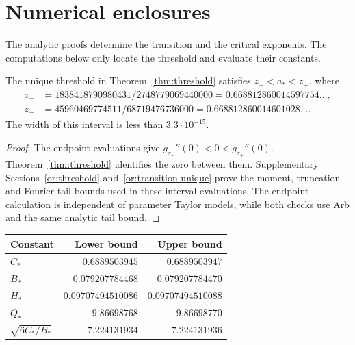 \section{Numerical enclosures}\label{app:threshold}

The analytic proofs determine the transition and the critical exponents.
The computations below only locate the threshold and evaluate their constants.

\begin{corollary}\label{cor:threshold-bracket}
The unique threshold in Theorem~\ref{thm:threshold} satisfies
$z_-<a_*<z_+$, where
\[
 \begin{aligned}
 z_-&=1838418790980431/2748779069440000
      =0.668812860014597754\ldots,\\
 z_+&=45960469774511/68719476736000
      =0.668812860014601028\ldots.
 \end{aligned}
\]
The width of this interval is less than $3.3\cdot10^{-15}$.
\end{corollary}

\begin{proof}
The endpoint evaluations give $g_{z_-}''(0)<0<g_{z_+}''(0)$.
Theorem~\ref{thm:threshold} identifies the zero between them.
Supplementary Sections~\ref{or:threshold} and~\ref{or:transition-unique}
prove the moment, truncation and Fourier-tail bounds used in these
interval evaluations. The endpoint calculation is independent of
parameter Taylor models, while both checks use Arb and the same
analytic tail bound.
\end{proof}

\begin{center}\small
\captionsetup{hypcap=false}
\begin{tabular}{@{}lrr@{}}
\toprule
Constant & Lower bound & Upper bound\\
\midrule
$C_*$ & $0.6889503945$ & $0.6889503947$\\
$B_*$ & $0.079207784468$ & $0.079207784470$\\
$H_*$ & $0.09707494510086$ & $0.09707494510088$\\
$Q_*$ & $9.86698768$ & $9.86698770$\\
$\sqrt{6C_*/B_*}$ & $7.224131934$ & $7.224131936$\\
\bottomrule
\end{tabular}
\label{tab:critical-constants}
\end{center}
